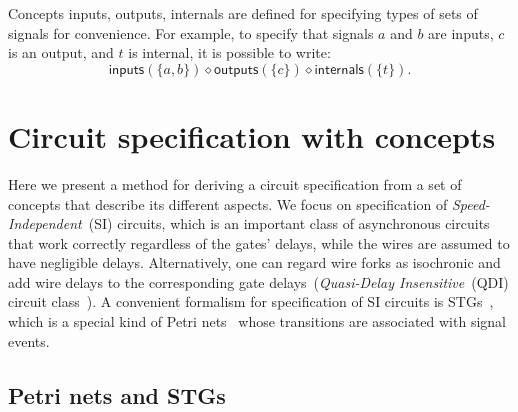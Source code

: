 \documentclass[british,compsoc]{IEEEtran}
\begin{document}
Concepts \textsf{inputs}, \textsf{outputs}, \textsf{internals} are defined for
specifying types of sets of signals for convenience. For example, to specify
that signals $a$ and $b$ are inputs, $c$ is an output, and $t$ is internal, it
is possible to write:
\[
\mathsf{inputs}(\{a, b\}) \diamond \mathsf{outputs}(\{c\}) \diamond \mathsf{internals}(\{t\}).
\]

\section{Circuit specification with concepts \label{sec:Circuit-specification-with}}


Here we present a method for deriving a circuit specification
from a set of concepts that describe its different aspects. We focus
on specification of \emph{Speed-Independent}~(SI) circuits, which
is an important class of asynchronous circuits~\cite{Muller_1959_ts}
that work correctly regardless of the gates' delays, while the wires
are assumed to have negligible delays. Alternatively, one can regard
wire forks as isochronic and add wire delays to the corresponding
gate delays~(\emph{Quasi-Delay Insensitive}~(QDI) circuit class~\cite{Martin_1986_dc}).
A convenient formalism for specification of SI circuits is STGs~\cite{Chu_1987_phd,Rosenblum_1985_tpn},
which is a special kind of Petri nets~\cite{Petri_1962_phd} whose
transitions are associated with signal events.


\subsection{Petri nets and STGs}

\end{document}
